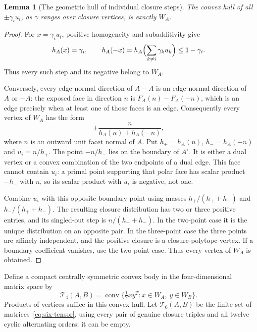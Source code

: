 \documentclass[11pt,a4paper]{article}
\newtheorem{lemma}[theorem]{Lemma}
\theoremstyle{definition}\newtheorem{definition}[theorem]{Definition}
\theoremstyle{remark}\newtheorem{remark}[theorem]{Remark}
\newcommand{\conv}{\operatorname{conv}}
\newcommand{\Tfour}{\mathcal T_4}
\newcommand{\Tsix}{\mathcal T_6}
\begin{document}
\begin{lemma}[The geometric hull of individual closure steps]\label{lem:width}
The convex hull of all $\pm\gamma_i u_i$, as $\gamma$ ranges over closure vertices, is exactly $W_A$.
\end{lemma}
\begin{proof}
For $x=\gamma_i u_i$, positive homogeneity and subadditivity give
\[
 h_A(x)=\gamma_i,\qquad
 h_A(-x)=h_A\Bigl(\sum_{k\ne i}\gamma_k u_k\Bigr)\le1-\gamma_i.
\]
Thus every such step and its negative belong to $W_A$.

Conversely, every edge-normal direction of $A-A$ is an edge-normal direction of $A$ or $-A$: the exposed face in direction $n$ is $F_A(n)-F_A(-n)$, which is an edge precisely when at least one of those faces is an edge. Consequently every vertex of $W_A$ has the form
\[
 \pm\frac{n}{h_A(n)+h_A(-n)},
\]
where $n$ is an outward unit facet normal of $A$. Put $h_+=h_A(n)$, $h_-=h_A(-n)$ and $u_i=n/h_+$. The point $-n/h_-$ lies on the boundary of $A^\circ$. It is either a dual vertex or a convex combination of the two endpoints of a dual edge. This face cannot contain $u_i$: a primal point supporting that polar face has scalar product $-h_-$ with $n$, so its scalar product with $u_i$ is negative, not one.

Combine $u_i$ with this opposite boundary point using masses $h_+/(h_++h_-)$ and $h_-/(h_++h_-)$. The resulting closure distribution has two or three positive entries, and its singled-out step is $n/(h_++h_-)$. In the two-point case it is the unique distribution on an opposite pair. In the three-point case the three points are affinely independent, and the positive closure is a closure-polytope vertex. If a boundary coefficient vanishes, use the two-point case. Thus every vertex of $W_A$ is obtained.
\end{proof}

Define a compact centrally symmetric convex body in the four-dimensional matrix space by
\begin{equation}\label{eq:Tfour}
 \Tfour(A,B)=\conv\{\tfrac12xy^T:x\in W_A,\ y\in W_B\}.
\end{equation}
Products of vertices suffice in this convex hull. Let $\Tsix(A,B)$ be the finite set of matrices~\eqref{eq:six-tensor}, using every pair of genuine closure triples and all twelve cyclic alternating orders; it can be empty.
\end{document}
